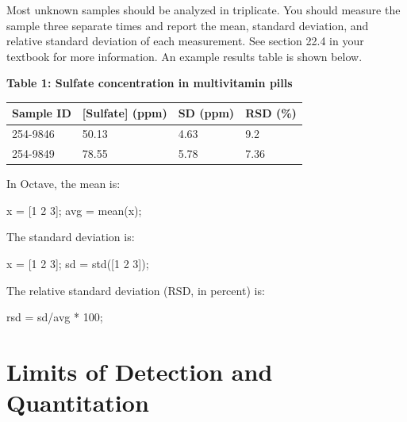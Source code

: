 \documentclass[]{tufte-book}
\newenvironment{Shaded}{}{}
\newcommand{\FloatTok}[1]{\textcolor[rgb]{0.25,0.63,0.44}{#1}}
\newcommand{\FunctionTok}[1]{\textcolor[rgb]{0.02,0.16,0.49}{#1}}
\newcommand{\NormalTok}[1]{#1}
\newcommand{\OperatorTok}[1]{\textcolor[rgb]{0.40,0.40,0.40}{#1}}
\begin{document}
Most unknown samples should be analyzed in triplicate. You should measure the sample three separate times and report the mean, standard deviation, and relative standard deviation of each measurement. See section 22.4 in your textbook for more information. An example results table is shown below.

\textbf{Table 1: Sulfate concentration in multivitamin pills}

\begin{longtable}[]{@{}llll@{}}
\toprule
Sample ID & {[}Sulfate{]} (ppm) & SD (ppm) & RSD (\%)\tabularnewline
\midrule
\endhead
254-9846 & 50.13 & 4.63 & 9.2\tabularnewline
254-9849 & 78.55 & 5.78 & 7.36\tabularnewline
\bottomrule
\end{longtable}

In Octave, the mean is:

\begin{Shaded}
\begin{Highlighting}[]
\NormalTok{x }\OperatorTok{=}\NormalTok{ [}\FloatTok{1} \FloatTok{2} \FloatTok{3}\NormalTok{]}\OperatorTok{;}
\NormalTok{avg }\OperatorTok{=} \FunctionTok{mean}\NormalTok{(x)}\OperatorTok{;}
\end{Highlighting}
\end{Shaded}

The standard deviation is:

\begin{Shaded}
\begin{Highlighting}[]
\NormalTok{x }\OperatorTok{=}\NormalTok{ [}\FloatTok{1} \FloatTok{2} \FloatTok{3}\NormalTok{]}\OperatorTok{;}
\NormalTok{sd }\OperatorTok{=} \FunctionTok{std}\NormalTok{([}\FloatTok{1} \FloatTok{2} \FloatTok{3}\NormalTok{])}\OperatorTok{;}
\end{Highlighting}
\end{Shaded}

The relative standard deviation (RSD, in percent) is:

\begin{Shaded}
\begin{Highlighting}[]
\NormalTok{rsd }\OperatorTok{=}\NormalTok{ sd}\OperatorTok{/}\NormalTok{avg }\OperatorTok{*} \FloatTok{100}\OperatorTok{;}
\end{Highlighting}
\end{Shaded}

\hypertarget{limits-of-detection-and-quantitation-1}{%
\section*{Limits of Detection and Quantitation}\label{limits-of-detection-and-quantitation-1}}
\end{document}
